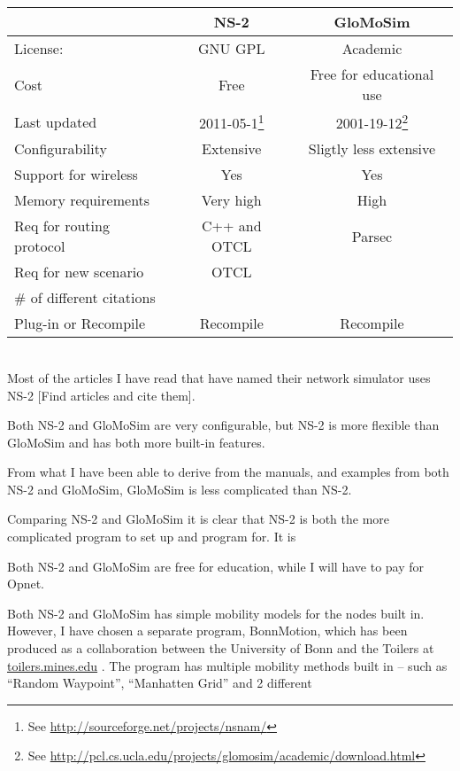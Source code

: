 \begin{tabular}[3]{l|c|c}
                          & NS-2      & GloMoSim \\
\hline
License:                  & GNU GPL   & Academic \\
Cost                      & Free      & Free for educational use \\
Last updated              & 2011-05-1\footnote{See \url{http://sourceforge.net/projects/nsnam/}} & 2001-19-12\footnote{See \url{http://pcl.cs.ucla.edu/projects/glomosim/academic/download.html}}\\
Configurability           & Extensive & Sligtly less extensive \\
Support for wireless      & Yes       & Yes \\
Memory requirements       & Very high & High \\
Req for routing protocol  & C++ and OTCL & Parsec \\
Req for new scenario      & OTCL      & \\
\# of different citations & & \\
Plug-in or Recompile      & Recompile & Recompile \\

\end{tabular}\\

Most of the articles I have read that have named their network simulator uses NS-2 [Find articles and cite them].

Both NS-2 and GloMoSim are very configurable, but NS-2 is more flexible than GloMoSim and has both more built-in features.

From what I have been able to derive from the manuals, and examples from both NS-2 and GloMoSim, GloMoSim is less complicated than NS-2.

Comparing NS-2 and GloMoSim it is clear that NS-2 is both the more complicated program to set up and program for. It is 

Both NS-2 and GloMoSim are free for education, while I will have to pay for Opnet.

Both NS-2 and GloMoSim has simple mobility models for the nodes built in. However, I have chosen a separate program, BonnMotion, which has been produced as a collaboration between the University of Bonn and the Toilers at \url{toilers.mines.edu} . The program has multiple mobility methods built in -- such as ``Random Waypoint'', ``Manhatten Grid'' and 2 different
